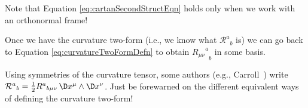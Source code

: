 \begin{danger}
Note that Equation \eqref{eq:cartanSecondStructEqn} holds only
when we work with an orthonormal frame!
\end{danger}

\medskip
\noindent\ignorespaces Once we have the curvature two-form (i.e., we know what
${\mathcal{R}^{a}}_{b}$ is) we can go back to Equation
\eqref{eq:curvatureTwoFormDefn} to obtain
${{R_{\mu\nu}}^{a}}_{b}$ in some basis. 


\begin{danger}
Using symmetries of the curvature tensor, some authors (e.g.,
Carroll~\cite{Carroll:2004st}) write
${\mathcal{R}^{a}}_{b}=\frac{1}{2}{R^{a}}_{b\mu\nu}\,\D x^{\mu}\wedge\D x^{\nu}$.
Just be forewarned on the different equivalent ways of defining
the curvature two-form!
\end{danger}
